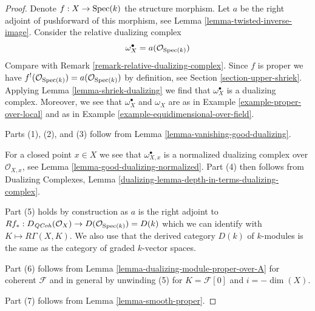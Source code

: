 \begin{proof}
Denote $f : X \to \mathop{\mathrm{Spec}}(k)$ the structure morphism. Let $a$ be the
right adjoint of pushforward of this morphism, see
Lemma \ref{lemma-twisted-inverse-image}. Consider the relative dualizing
complex
$$
\omega_X^\bullet = a(\mathcal{O}_{\mathop{\mathrm{Spec}}(k)})
$$
Compare with Remark \ref{remark-relative-dualizing-complex}.
Since $f$ is proper we have
$f^!(\mathcal{O}_{\mathop{\mathrm{Spec}}(k)}) = a(\mathcal{O}_{\mathop{\mathrm{Spec}}(k)})$ by
definition, see Section \ref{section-upper-shriek}.
Applying Lemma \ref{lemma-shriek-dualizing} we find that
$\omega_X^\bullet$ is a dualizing complex. Moreover, we see that
$\omega_X^\bullet$ and $\omega_X$ are as in
Example \ref{example-proper-over-local} and as in
Example \ref{example-equidimensional-over-field}.

\medskip\noindent
Parts (1), (2), and (3) follow from
Lemma \ref{lemma-vanishing-good-dualizing}.

\medskip\noindent
For a closed point $x \in X$ we see that $\omega_{X, x}^\bullet$ is a
normalized dualizing complex over $\mathcal{O}_{X, x}$, see
Lemma \ref{lemma-good-dualizing-normalized}.
Part (4) then follows from Dualizing Complexes, Lemma
\ref{dualizing-lemma-depth-in-terms-dualizing-complex}.

\medskip\noindent
Part (5) holds by construction as $a$ is the right adjoint to
$Rf_* : D_{\mathit{QCoh}}(\mathcal{O}_X) \to D(\mathcal{O}_{\mathop{\mathrm{Spec}}(k)}) = D(k)$
which we can identify with $K \mapsto R\Gamma(X, K)$. We also use
that the derived category $D(k)$ of $k$-modules is the same as the
category of graded $k$-vector spaces.

\medskip\noindent
Part (6) follows from Lemma \ref{lemma-dualizing-module-proper-over-A}
for coherent $\mathcal{F}$ and in general by unwinding
(5) for $K = \mathcal{F}[0]$ and $i = -\dim(X)$.

\medskip\noindent
Part (7) follows from Lemma \ref{lemma-smooth-proper}.
\end{proof}

